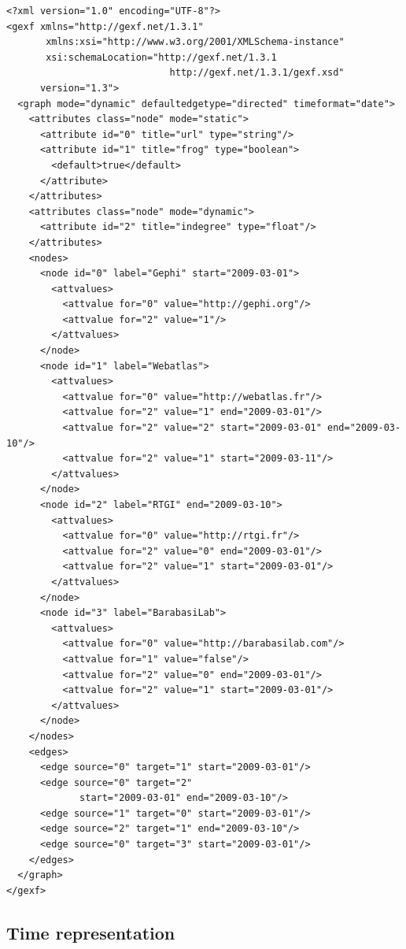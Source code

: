 \documentclass[a4paper,10pt]{article}
\begin{document}
\lstset{ style=gexf }
\begin{lstlisting}[caption={A (small) Dynamic Web Graph with date format},label=dynwebgraph]
<?xml version="1.0" encoding="UTF-8"?>
<gexf xmlns="http://gexf.net/1.3.1"
       xmlns:xsi="http://www.w3.org/2001/XMLSchema-instance"
       xsi:schemaLocation="http://gexf.net/1.3.1
                             http://gexf.net/1.3.1/gexf.xsd"
      version="1.3">
  <graph mode="dynamic" defaultedgetype="directed" timeformat="date">
    <attributes class="node" mode="static">
      <attribute id="0" title="url" type="string"/>
      <attribute id="1" title="frog" type="boolean">
        <default>true</default>
      </attribute>
    </attributes>
    <attributes class="node" mode="dynamic">
      <attribute id="2" title="indegree" type="float"/>
    </attributes>
    <nodes>
      <node id="0" label="Gephi" start="2009-03-01">
        <attvalues>
          <attvalue for="0" value="http://gephi.org"/>
          <attvalue for="2" value="1"/>
        </attvalues>
      </node>
      <node id="1" label="Webatlas">
        <attvalues>
          <attvalue for="0" value="http://webatlas.fr"/>
          <attvalue for="2" value="1" end="2009-03-01"/>
          <attvalue for="2" value="2" start="2009-03-01" end="2009-03-10"/>
          <attvalue for="2" value="1" start="2009-03-11"/>
        </attvalues>
      </node>
      <node id="2" label="RTGI" end="2009-03-10">
        <attvalues>
          <attvalue for="0" value="http://rtgi.fr"/>
          <attvalue for="2" value="0" end="2009-03-01"/>
          <attvalue for="2" value="1" start="2009-03-01"/>
        </attvalues>
      </node>
      <node id="3" label="BarabasiLab">
        <attvalues>
          <attvalue for="0" value="http://barabasilab.com"/>
          <attvalue for="1" value="false"/>
          <attvalue for="2" value="0" end="2009-03-01"/>
          <attvalue for="2" value="1" start="2009-03-01"/>
        </attvalues>
      </node>
    </nodes>
    <edges>
      <edge source="0" target="1" start="2009-03-01"/>
      <edge source="0" target="2"
             start="2009-03-01" end="2009-03-10"/>
      <edge source="1" target="0" start="2009-03-01"/>
      <edge source="2" target="1" end="2009-03-10"/>
      <edge source="0" target="3" start="2009-03-01"/>
    </edges>
  </graph>
</gexf>
\end{lstlisting}

\subsection{Time representation}
\end{document}
